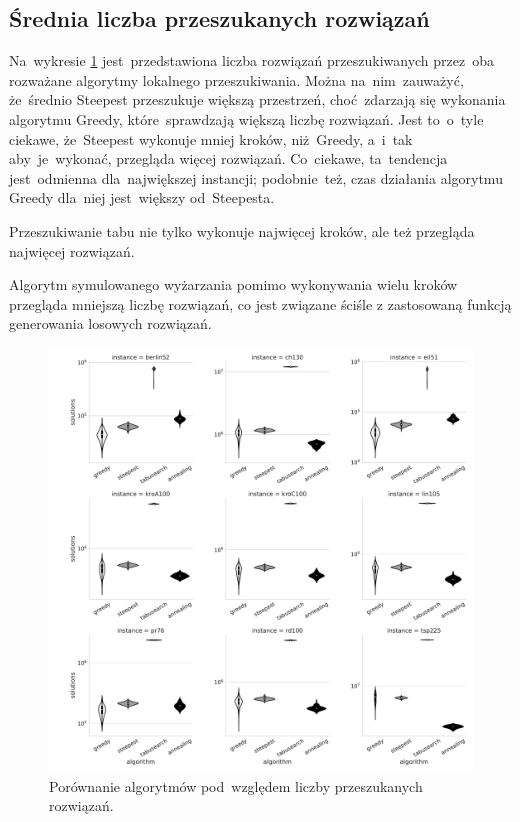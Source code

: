 \subsection{Średnia liczba przeszukanych rozwiązań}

Na~wykresie \ref{fig:nsol} jest~przedstawiona liczba rozwiązań przeszukiwanych przez~oba rozważane algorytmy lokalnego przeszukiwania. Można na~nim~zauważyć, że~średnio Steepest przeszukuje większą przestrzeń, choć~zdarzają się wykonania algorytmu Greedy, które~sprawdzają większą liczbę rozwiązań. Jest to~o~tyle ciekawe, że~Steepest wykonuje mniej kroków, niż~Greedy, a~i~tak aby~je~wykonać, przegląda więcej rozwiązań. Co~ciekawe, ta~tendencja jest~odmienna dla~największej instancji; podobnie~też, czas działania algorytmu Greedy dla~niej jest~większy od~Steepesta.

{\color{part2}
Przeszukiwanie tabu nie tylko wykonuje najwięcej kroków, ale też przegląda najwięcej rozwiązań.

Algorytm symulowanego wyżarzania pomimo wykonywania wielu kroków przegląda mniejszą liczbę rozwiązań, co jest związane ściśle z zastosowaną funkcją generowania losowych rozwiązań.
}

\begin{figure}[H]
\begin{center}
\includegraphics[width=1.0\textwidth]{graphs/solutions_comparison_violin.pdf}
\end{center}
\caption{Porównanie algorytmów pod~względem liczby przeszukanych rozwiązań.}
\label{fig:nsol}
\end{figure}


